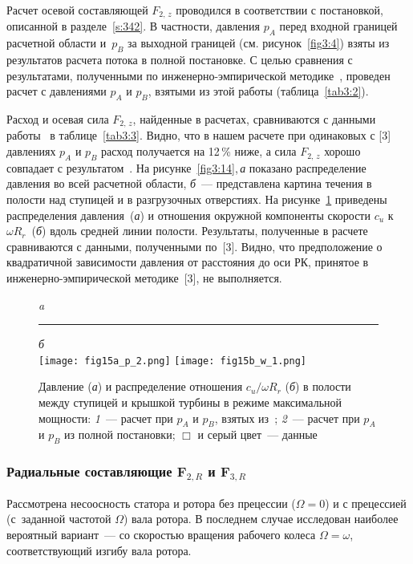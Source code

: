 Расчет осевой составляющей   $F_{2,\,z}$ проводился в соответствии с постановкой, описанной в 
разделе~\ref{s:342}.
В частности, давления $p_A$ перед входной границей расчетной области и~$p_B$ за выходной границей 
(см. рисунок~\ref{fig3:4}) взяты из результатов расчета потока в полной постановке. С целью сравнения с 
результатами, полученными по инженерно-эмпирической методике~\cite{mak_pilev}, проведен расчет с 
давлениями $p_A$  и $p_B$, взятыми из этой работы (таблица~\ref{tab3:2}).

Расход и осевая сила $F_{2,\,z}$, найденные в расчетах, сравниваются с данными работы~\cite{mak_pilev} 
в таблице~\ref{tab3:3}. Видно, что в нашем расчете при одинаковых с [3] давлениях $p_A$ и $p_B$ расход 
получается на 12\,\% ниже, а сила $F_{2,\,z}$ хорошо совпадает с результатом~\cite{mak_pilev}. На 
рисунке~\ref{fig3:14},\,{\it а}  показано распределение давления во всей расчетной 
области, {\it б}~--- представлена картина течения в полости над ступицей и в разгрузочных отверстиях. 
На рисунке~\ref{fig3:15} приведены распределения давления~({\it а}) и отношения окружной
компоненты скорости $c_u$ к $\omega R_r$~({\it б}) вдоль средней линии полости. Результаты, полученные 
в расчете сравниваются с данными, полученными по~[3]. Видно, что предположение о квадратичной зависимости 
давления от расстояния до оси РК, принятое в инженерно-эмпирической методике~[3], не выполняется.
\begin{figure}[t!]%
\centering \small \emph{a}\rule{90mm}{0mm}\emph{б} \\[1.5mm]
  {\texttt{[image: fig15a\_p\_2.png]}}\hfill
  {\texttt{[image: fig15b\_w\_1.png]}}
  \caption{Давление ({\it а}) и распределение отношения $c_u/\omega R_r$ ({\it б}) в полости между 
  ступицей и крышкой турбины в режиме максимальной мощности:
  {\sl 1}~--- расчет при $p_A$ и $p_B$, взятых из~\cite{mak_pilev};
  {\sl 2}~--- расчет при $p_A$ и $p_B$ из полной постановки; $\Box$ и серый цвет~--- данные~\cite{mak_pilev}}
  \label{fig3:15}
\end{figure}

\subsubsection{Радиальные составляющие $\textbf{F}_{2,R}$ и $\textbf{F}_{3,R}$}
\label{s:3613}
Рассмотрена несоосность статора и ротора без прецессии ($\Omega=0$) и с 
прецессией (с~заданной частотой $\Omega$) вала ротора. В последнем случае исследован наиболее 
вероятный вариант~--- со скоростью вращения рабочего колеса  $\Omega=\omega$, соответствующий изгибу
вала ротора.

